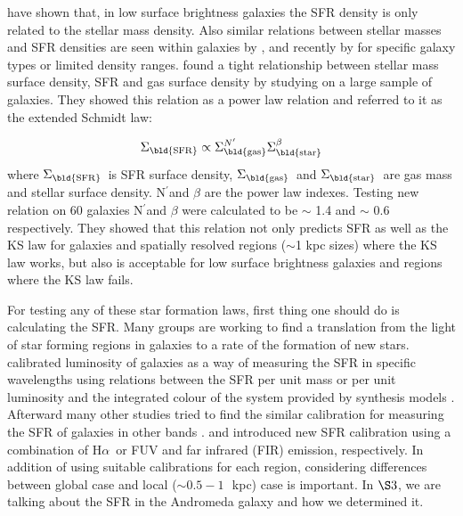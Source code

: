 \documentclass[useAMS,usenatbib]{mn2e}
\newcommand \kpc        {\,{\rm kpc}}
\newcommand \sigmagas    {$\Sigma_{\rm \bld {gas }}$\ }
\newcommand \eqsigmagas    {\Sigma_{\rm \bld {gas }}}
\newcommand \sigmasfr     {$\Sigma_{\rm \bld {SFR }}$\ }
\newcommand \eqsigmasfr     {\Sigma_{\rm \bld {SFR }}}
\newcommand \sigmastar    {$\Sigma_{\rm \bld {star }}$\ }
\newcommand \eqsigmastar    {\Sigma_{\rm \bld {star }}}
\newcommand \halpha    {H$\alpha $\ }
\newcommand \nprime {N$^\prime$}
\newcommand \eqnprime {N^\prime}
\begin{document}
\cite{Hunter98} have shown that, in low surface brightness galaxies the SFR density is only related to the stellar mass density. Also similar relations between stellar masses and SFR densities are seen within galaxies by \cite{Ryder94}, \cite{Hunter04} and recently by \cite{Leroy08} for specific galaxy types or limited density ranges. \cite{Shi11} found a tight relationship between stellar mass surface density, SFR and gas surface density by studying on a large sample of galaxies. They showed this relation as a power law relation and referred to it as the extended Schmidt law:

\begin{equation}
\eqsigmasfr \propto \eqsigmagas^{\eqnprime} \eqsigmastar^{\beta}
\end{equation}
where \sigmasfr is SFR surface density, \sigmagas and \sigmastar are gas mass and stellar surface density. \nprime and $\beta$ are the power law indexes. Testing new relation on 60 galaxies \nprime and $\beta$ were calculated to be $\sim$ 1.4 and $\sim$ 0.6 respectively. They showed that this relation not only predicts SFR as well as the KS law for galaxies and spatially resolved regions ($\sim$1 kpc sizes) where the KS law works, but also is acceptable for low surface brightness galaxies and regions where the KS law fails.

For testing any of these star formation laws, first thing one should do is calculating the SFR. Many groups are working to find a translation from the light of star forming regions in galaxies to a rate of the formation of new stars. \cite{Kennicutt98b} calibrated luminosity of galaxies as a way of measuring the SFR in specific wavelengths using relations between the SFR per unit mass or per unit luminosity and the integrated colour of the system provided by synthesis models  \citep[e.g.,][]{Bruzual93}. Afterward many other studies tried to find the similar calibration for measuring the SFR of galaxies in other bands \citep[e.g.,][]{Kennicutt12, Calzetti12, Zhu08, Kennicutt09, Boquien10, Boquien11, Hao11}. \cite{Kennicutt09} and \cite{Hao11} introduced new SFR calibration using a combination of \halpha or FUV and far infrared (FIR) emission, respectively. In addition of using suitable calibrations for each region, considering differences between global case and local ($\sim 0.5-1$~\kpc) case is important. In $\S3$, we are talking about the SFR in the Andromeda galaxy and how we determined it.
\end{document}
